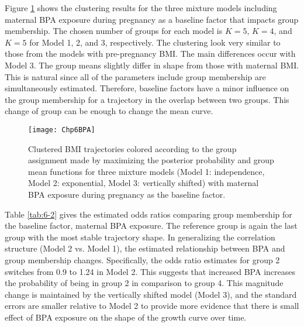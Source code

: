 Figure \ref{fig:6-2} shows the clustering results for the three mixture models including maternal BPA exposure during pregnancy as a baseline factor that impacts group membership. The chosen number of groups for each model is $K = 5$, $K=4$, and $K=5$ for Model 1, 2, and 3, respectively. The clustering look very similar to those from the models with pre-pregnancy BMI. The main differences occur with Model 3. The group means slightly differ in shape from those with maternal BMI. This is natural since all of the parameters include group membership are simultaneously estimated. Therefore, baseline factors have a minor influence on the group membership for a trajectory in the overlap between two groups. This change of group can be enough to change the mean curve.

\begin{figure}[h]
\centering
\texttt{[image: Chp6BPA]}
\caption{Clustered BMI trajectories colored according to the group assignment made by maximizing the posterior probability and group mean functions for three mixture models (Model 1: independence, Model 2: exponential, Model 3: vertically shifted) with maternal BPA exposure during pregnancy as the baseline factor.}
\label{fig:6-2}
\end{figure}

Table \ref{tab:6-2} gives the estimated odds ratios comparing group membership for the baseline factor, maternal BPA exposure. The reference group is again the last group with the most stable trajectory shape. In generalizing the correlation structure (Model 2 vs. Model 1), the estimated relationship between BPA and group membership changes. Specifically, the odds ratio estimates for group 2 switches from 0.9 to 1.24 in Model 2. This suggests that increased BPA increases the probability of being in group 2 in comparison to group 4. This magnitude change is maintained by the vertically shifted model (Model 3), and the standard errors are smaller relative to Model 2 to provide more evidence that there is small effect of BPA exposure on the shape of the growth curve over time. 


